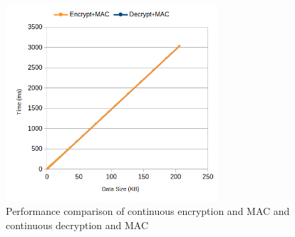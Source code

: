\begin{figure}[h!]
	\centering
	\includegraphics[width=0.7\textwidth]{./Images/services-time.png}
	\caption{Performance comparison of continuous encryption and MAC and continuous decryption and MAC}
	\label{fig:performance:services-time}
\end{figure}
